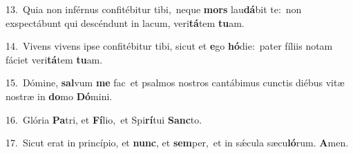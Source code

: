 {\numbfont\textcolor{\numbcolor}{13.}}~Quia non inférnus confitébitur tibi,~\dagger neque \textbf{mors} lau\-\textbf{dá}\-bit te:~\star non exspectábunt qui descéndunt in lacum, veri\-\textbf{tá}\-tem \textbf{tu}\-am.\par
{\numbfont\textcolor{\numbcolor}{14.}}~Vivens vivens ipse confitébitur tibi, sicut et \textbf{e}\-go \textbf{hó}\-die:~\star pater fíliis notam fáciet veri\-\textbf{tá}\-tem \textbf{tu}\-am.\par
{\numbfont\textcolor{\numbcolor}{15.}}~Dómine, \textbf{sal}\-vum \textbf{me} fac~\star et psalmos nostros cantábimus cunctis diébus vitæ nostræ in \textbf{do}\-mo \textbf{Dó}\-mini.\par
{\numbfont\textcolor{\numbcolor}{16.}}~Glória \textbf{Pa}\-tri, et \textbf{Fí}\-lio,~\star et Spi\-\textbf{rí}\-tui \textbf{Sanc}\-to.\par
{\numbfont\textcolor{\numbcolor}{17.}}~Sicut erat in princípio, et \textbf{nunc}\-, et \textbf{sem}\-per,~\star et in sǽcula sæcu\-\textbf{ló}\-rum. \textbf{A}\-men.\par
